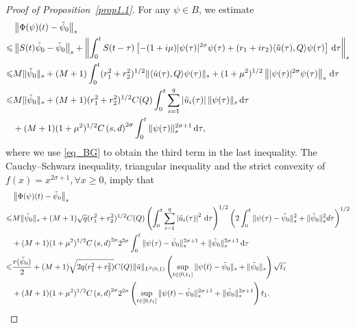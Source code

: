 \documentclass[review]{elsarticle}
\theoremstyle{dotless}
\def\d{{\,\rm d}}
\def \leq{\leqslant}
\def \geq{\geqslant}
\numberwithin{equation}{section}
\begin{document}
\begin{proof}[Proof of Proposition~\ref{prop1.1}]
	For any $\psi\in B$, we estimate
	\begin{equation*}
		\begin{aligned}
			&\left\|\Phi(\psi)(t)-\tilde{\psi}_0\right\|_{s} \\ 
			\leq & \left\|S(t) \tilde{\psi}_0-\tilde{\psi}_0\right\|_{s}+\left\|\int_0^t S(t-\tau)\left[-(1+i \mu)|\psi(\tau)|^{2 \sigma} \psi(\tau) +(r_1+ir_2)\langle \tilde{u}(\tau),Q\rangle\psi(\tau)\right] \d \tau\right\|_{s} \\
			\leq & M \|\tilde{\psi}_0 \|_{s}+(M+1)\int_0^t( r_1^2+r_2^2)^{1/2}\|\langle \tilde{u}(\tau), Q\rangle \psi(\tau)\|_{s}+(1+\mu^2)^{1/2}\left\||\psi(\tau)|^{2\sigma}\psi(\tau)\right\|_{s}\d\tau \\
			\leq & M \|\tilde{\psi}_0 \|_{s}+(M+1) ( r_1^2+r_2^2)^{1/2}C(Q) \int_0^t \sum_{i=1}^q\left|\tilde{u}_i(\tau)\right|\|\psi(\tau)\|_{s} \d \tau\\&+(M+1)(1+\mu^2)^{1/2}{C\left(s,d\right)}^{2\sigma}\int_0^t\|\psi(\tau)\|_{s}^{2\sigma+1} \d \tau,
		\end{aligned}
	\end{equation*}
	where we use \eqref{eq_BG} to obtain the third term in the last inequality. The Cauchy–Schwarz inequality, triangular inequality and the strict convexity of $f(x)=x^{2\sigma+1}, \forall x\geq0$, imply that 
	\begin{equation*}
		\begin{aligned}
			&\left\|\Phi(\psi)(t)-\tilde{\psi}_0\right\|_{s} \\ 
			\leq & M \|\tilde{\psi}_0 \|_{s}+(M+1) \sqrt{q} ( r_1^2+r_2^2)^{1/2}C(Q)\left(\int_0^t \sum_{i=1}^q\left|\tilde{u}_i(\tau)\right|^2 \d \tau\right)^{1 / 2}
			\left(2 \int_0^t \|\psi(\tau)-\tilde{\psi}_0 \|_{s}^2+ \|\tilde{\psi}_0 \|_{s}^2d \tau\right)^{1 / 2} \\
			& +(M+1)(1+\mu^2)^{1/2}{C\left(s,d\right) }^{2\sigma}2^{2\sigma} \int_0^t \|\psi(\tau)-\tilde{\psi}_0 \|_{s}^{2\sigma+1}+ \|\tilde{\psi}_0 \|_{s}^{2\sigma+1} \d \tau\\
			\leq& \frac{r(\tilde{\psi}_0)}{2} + (M+1) \sqrt{2q( r_1^2+r_2^2)}  C(Q) \|\tilde{u}\|_{L^2(0,1)}\left( \sup _{t \in [0,t_1]} \|\psi(t)-\tilde{\psi}_0 \|_{s} + \|\tilde{\psi}_0\|_s \right)\sqrt{t_1}\\
			&+(M+1)(1+\mu^2)^{1/2}{C\left(s,d\right) }^{2\sigma}2^{2\sigma}\left( \sup _{t \in [0,t_1]} \|\psi(t)-\tilde{\psi}_0 \|_{s}^{2\sigma+1} + \|\tilde{\psi}_0\|_s^{2\sigma+1} \right)t_1.
		\end{aligned}
	\end{equation*}

\end{proof}
\end{document}
